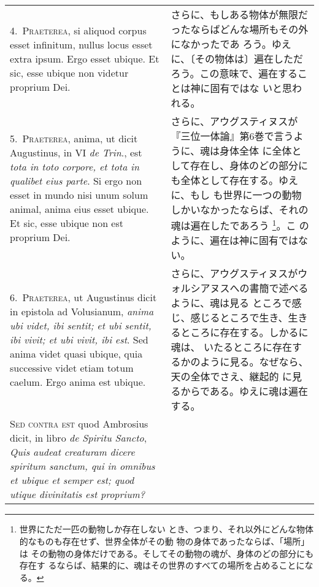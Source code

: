 \documentclass[10pt]{jsarticle} %
\begin{document}
\begin{longtable}{p{21em}p{21em}}
\\


4.~{\scshape Praeterea}, si aliquod corpus esset infinitum, nullus locus esset
 extra ipsum. Ergo esset ubique. Et sic, esse ubique non videtur
 proprium Dei.

&

さらに、もしある物体が無限だったならばどんな場所もその外になかったであ
 ろう。ゆえに、〔その物体は〕遍在しただろう。この意味で、遍在することは神に固有ではな
 いと思われる。

\\


5.~{\scshape Praeterea}, anima, ut dicit Augustinus, in VI {\itshape de
 Trin}., est {\itshape tota in toto corpore, et tota in qualibet eius
 parte}. Si ergo non esset in mundo nisi unum solum animal, anima eius
 esset ubique. Et sic, esse ubique non est proprium Dei.

&

さらに、アウグスティヌスが『三位一体論』第6巻で言うように、魂は身体全体
 に全体として存在し、身体のどの部分にも全体として存在する。ゆえに、もし
 も世界に一つの動物しかいなかったならば、それの魂は遍在したであろう
 \footnote{世界にただ一匹の動物しか存在しない
 とき、つまり、それ以外にどんな物体的なものも存在せず、世界全体がその動
 物の身体であったならば、「場所」は
 その動物の身体だけである。そしてその動物の魂が、身体のどの部分にも存在す
 るならば、結果的に、魂はその世界のすべての場所を占めることになる。}。こ
 のように、遍在は神に固有ではない。

\\


6.~{\scshape Praeterea}, ut Augustinus dicit in epistola ad Volusianum,
 {\itshape anima ubi videt, ibi sentit; et ubi sentit, ibi vivit; et ubi
 vivit, ibi est}. Sed anima videt quasi ubique, quia successive videt
 etiam totum caelum. Ergo anima est ubique.

&

さらに、アウグスティヌスがウォルシアヌスへの書簡で述べるように、魂は見る
 ところで感じ、感じるところで生き、生きるところに存在する。しかるに魂は、
 いたるところに存在するかのように見る。なぜなら、天の全体でさえ、継起的
 に見るからである。ゆえに魂は遍在する。

\\

{\scshape Sed contra est} quod Ambrosius dicit, in libro {\itshape de
 Spiritu Sancto}, {\itshape Quis audeat creaturam dicere spiritum
 sanctum, qui in omnibus et ubique et semper est; quod utique
 divinitatis est proprium?}


\end{longtable}
\end{document}
